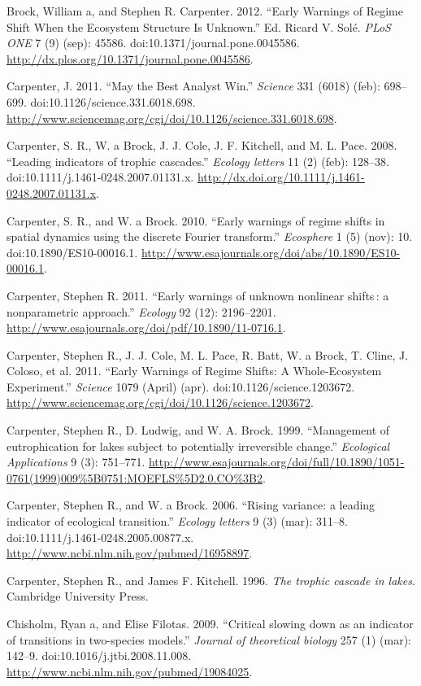 \documentclass[author-year, review]{elsarticle} %
\begin{document}
Brock, William a, and Stephen R. Carpenter. 2012. ``Early Warnings of
Regime Shift When the Ecosystem Structure Is Unknown.'' Ed. Ricard V.
Solé. \emph{PLoS ONE} 7 (9) (sep): 45586.
doi:10.1371/journal.pone.0045586.
\url{http://dx.plos.org/10.1371/journal.pone.0045586}.

Carpenter, J. 2011. ``May the Best Analyst Win.'' \emph{Science} 331
(6018) (feb): 698--699. doi:10.1126/science.331.6018.698.
\url{http://www.sciencemag.org/cgi/doi/10.1126/science.331.6018.698}.

Carpenter, S. R., W. a Brock, J. J. Cole, J. F. Kitchell, and M. L.
Pace. 2008. ``Leading indicators of trophic cascades.'' \emph{Ecology
letters} 11 (2) (feb): 128--38. doi:10.1111/j.1461-0248.2007.01131.x.
\url{http://dx.doi.org/10.1111/j.1461-0248.2007.01131.x}.

Carpenter, S. R., and W. a Brock. 2010. ``Early warnings of regime
shifts in spatial dynamics using the discrete Fourier transform.''
\emph{Ecosphere} 1 (5) (nov): 10. doi:10.1890/ES10-00016.1.
\url{http://www.esajournals.org/doi/abs/10.1890/ES10-00016.1}.

Carpenter, Stephen R. 2011. ``Early warnings of unknown nonlinear
shifts : a nonparametric approach.'' \emph{Ecology} 92 (12): 2196--2201.
\url{http://www.esajournals.org/doi/pdf/10.1890/11-0716.1}.

Carpenter, Stephen R., J. J. Cole, M. L. Pace, R. Batt, W. a Brock, T.
Cline, J. Coloso, et al. 2011. ``Early Warnings of Regime Shifts: A
Whole-Ecosystem Experiment.'' \emph{Science} 1079 (April) (apr).
doi:10.1126/science.1203672.
\url{http://www.sciencemag.org/cgi/doi/10.1126/science.1203672}.

Carpenter, Stephen R., D. Ludwig, and W. A. Brock. 1999. ``Management of
eutrophication for lakes subject to potentially irreversible change.''
\emph{Ecological Applications} 9 (3): 751--771.
\url{http://www.esajournals.org/doi/full/10.1890/1051-0761(1999)009\%5B0751:MOEFLS\%5D2.0.CO\%3B2}.

Carpenter, Stephen R., and W. a Brock. 2006. ``Rising variance: a
leading indicator of ecological transition.'' \emph{Ecology letters} 9
(3) (mar): 311--8. doi:10.1111/j.1461-0248.2005.00877.x.
\url{http://www.ncbi.nlm.nih.gov/pubmed/16958897}.

Carpenter, Stephen R., and James F. Kitchell. 1996. \emph{The trophic
cascade in lakes}. Cambridge University Press.

Chisholm, Ryan a, and Elise Filotas. 2009. ``Critical slowing down as an
indicator of transitions in two-species models.'' \emph{Journal of
theoretical biology} 257 (1) (mar): 142--9.
doi:10.1016/j.jtbi.2008.11.008.
\url{http://www.ncbi.nlm.nih.gov/pubmed/19084025}.
\end{document}
